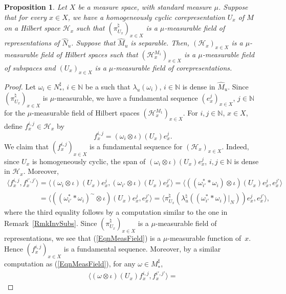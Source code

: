\documentclass[pdftex]{sigma}
\numberwithin{equation}{section}
\newtheorem{prop}[thm]{Proposition}
\theoremstyle{definition}
\newcommand{\cHil}{\mathcal{H}}
\begin{document}
\begin{prop}\label{PropMeas}
Let $X$ be a measure space, with standard measure $\mu$. Suppose that for every $x \in X$, we have a homogeneously cyclic corepresentation $U_x$ of $M$ on a Hilbert space $\cHil_x$ such that $(\pi_{U_x}^\natural)_{x \in X}$ is a $\mu$-measurable field of representations of $\hat{N}_u$. Suppose that $\hat{M}_u$ is separable. Then, $(\cHil_x)_{x \in X}$ is a $\mu$-measurable field of Hilbert spaces such that $(\cHil_x^{M_1})_{x \in X}$ is a $\mu$-measurable field of subspaces and $(U_x)_{x \in X}$ is a $\mu$-measurable field of corepresentations.
\end{prop}
\begin{proof}
Let $\omega_i \in N_\ast^\sharp$, $i \in \mathbb{N}$ be a such that $\lambda_u(\omega_i)$, $i \in \mathbb{N}$ is dense in $\hat{M}_u$. Since $(\pi_{U_x}^\natural)_{x \in X}$ is $\mu$-measurable, we have a fundamental sequence $(e_x^j)_{x\in X}$, $j \in \mathbb{N}$ for the $\mu$-measurable f\/ield of Hilbert spaces $(\cHil_x^{M_1})_{x \in X}$. For $i, j \in \mathbb{N}$, $x \in X$, def\/ine $f^{i,j}_x \in \cHil_x$ by
\[
f^{i,j}_x = (\omega_i \otimes \iota)(U_x) e^j_x.
\]
We claim that $(f^{i,j}_x)_{x\in X}$ is a fundamental sequence for $(\cHil_x)_{x \in X}$. Indeed, since $U_x$ is homogeneously cyclic, the span of $(\omega_i \otimes \iota)(U_x) e^j_x$, $i, j \in \mathbb{N}$ is dense in $\cHil_x$. Moreover,
\begin{gather}
\langle f^{i,j}_x , f^{i',j'}_x \rangle =   \langle (\omega_i \otimes \iota)(U_x) e^j_x, (\omega_{i'} \otimes \iota)(U_x) e^{j'}_x \rangle =
\langle ((\omega_{i'}^\ast \ast \omega_i) \otimes \iota)(U_x) e^j_x, e^{j'}_x \rangle
\nonumber \\
\phantom{\langle f^{i,j}_x , f^{i',j'}_x \rangle}{}
=
\langle ((\omega_{i'}^\ast \ast \omega_i)^\sim \otimes \iota)(U_x) e^j_x, e^{j'}_x \rangle = \langle \pi_{U_x}^\natural(\lambda_u^\natural((\omega_{i'}^\ast \ast \omega_i)\vert_N))  e^j_x, e^{j'}_x \rangle,\label{EqnMeasField}
\end{gather}
where the third equality follows by a computation similar to the one in Remark~\ref{RmkInvSubs}.
Since $(\pi_{U_x}^\natural)_{x\in X}$ is a $\mu$-measurable f\/ield of representations, we see that (\ref{EqnMeasField}) is a $\mu$-measurable function of~$x$. Hence $(f^{i,j}_x)_{x\in X}$ is a fundamental sequence. Moreover, by a similar computation as (\ref{EqnMeasField}), for any $\omega \in M_\ast^\sharp$,
\begin{gather*}
\langle (\omega \otimes \iota)(U_x) f^{i,j}_x, f^{i',j'}_x \rangle =

\end{gather*}
\end{proof}
\end{document}
